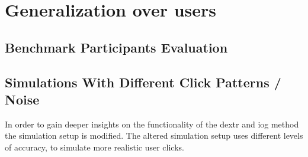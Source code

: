 
\section{Generalization over users}\label{ord:ch5:sec3_generalization_domains}



\subsection{Benchmark Participants Evaluation}\label{ord:ch5:sec3:subsec1}





\subsection{Simulations With Different Click Patterns / Noise}\label{ord:ch5:sec3:subsec2}

In order to gain deeper insights on the functionality of the \gls{dextr} and \gls{iog} method the simulation setup is modified.
The altered simulation setup uses different levels of accuracy, to simulate more realistic user clicks.

